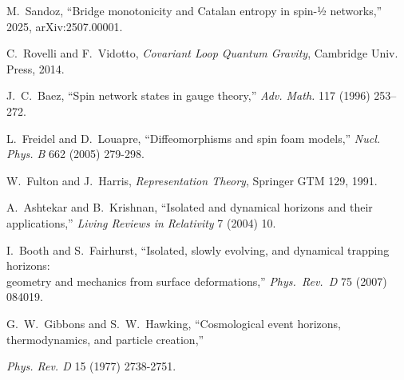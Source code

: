 \documentclass[11pt]{article}
\begin{document}
\begin{thebibliography}{8}

 M.~Sandoz, “Bridge monotonicity and Catalan entropy in spin-½ networks,” 2025, arXiv:2507.00001.

 C.~Rovelli and F.~Vidotto, \emph{Covariant Loop Quantum Gravity}, Cambridge Univ. Press, 2014.

 J.~C.~Baez, “Spin network states in gauge theory,” \emph{Adv. Math.} 117 (1996) 253–272.

 L.~Freidel and D.~Louapre, ``Diffeomorphisms and spin foam models,'' \emph{Nucl. Phys. B} 662 (2005) 279-298.

 W.~Fulton and J.~Harris, \emph{Representation Theory}, Springer GTM 129, 1991.

 A.~Ashtekar and B.~Krishnan, “Isolated and dynamical horizons and their applications,” \emph{Living Reviews in Relativity} 7 (2004) 10.

  I.~Booth and S.~Fairhurst, “Isolated, slowly evolving, and dynamical trapping horizons:\\
  geometry and mechanics from surface deformations,”
  \emph{Phys.\ Rev.\ D} 75 (2007) 084019.


G.~W.~Gibbons and S.~W.~Hawking, “Cosmological event horizons, thermodynamics, and particle creation,”

\emph{Phys. Rev. D} 15 (1977) 2738-2751.

\end{thebibliography}
\end{document}
